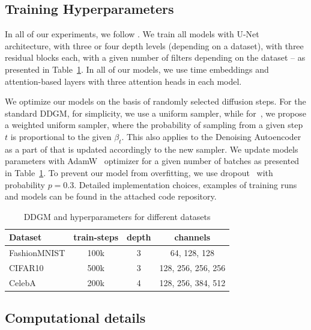 \newpage
\subsection{Training Hyperparameters}\label{appx:hyperparams}
In all of our experiments, we follow \citet{nichol2021improved}. We train all models with U-Net architecture, with three or four depth levels (depending on a dataset), with three residual blocks each, with a given number of filters depending on the dataset -- as presented in Table~\ref{tab:hyperparams}. In all of our models, we use time embeddings and attention-based layers with three attention heads in each model.

We optimize our models on the basis of randomly selected diffusion steps. For the standard DDGM, for simplicity, we use a uniform sampler, while for~\ours{}, we propose a weighted uniform sampler, where the probability of sampling from a given step $t$ is proportional to the given $\beta_t$. This also applies to the Denoising Autoencoder as a part of \ours{} that is updated accordingly to the new sampler. We update models parameters with AdamW~\cite{loshchilov2017decoupled} optimizer for a given number of batches as presented in Table~\ref{tab:hyperparams}. To prevent our model from overfitting, we use dropout~\cite{hinton2012improving} with probability $p=0.3$. Detailed implementation choices, examples of training runs and models can be found in the attached code repository.

\begin{table}[ht]
  \centering
  \caption{DDGM and \ours{} hyperparameters for different datasets
}
  \label{tab:hyperparams}
  \begin{tabular}{l||ccc}
    \toprule
     Dataset & train-steps & depth & channels\\
     
    \midrule
    FashionMNIST & 100k & 3 & 64, 128, 128 \\
    CIFAR10 & 500k & 3 & 128, 256, 256, 256 \\
    CelebA & 200k & 4 & 128, 256, 384, 512\\

    \bottomrule
  \end{tabular}
		\vspace*{2\baselineskip}
\end{table}

\subsection{Computational details}

